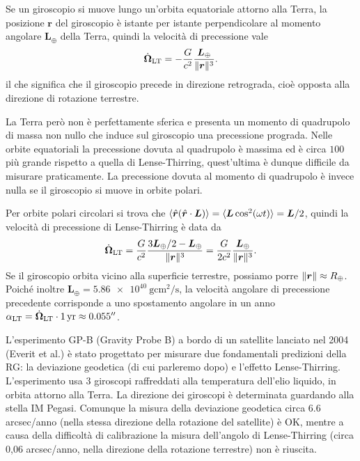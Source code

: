 Se un giroscopio si muove lungo un'orbita equatoriale attorno alla Terra, la
posizione $\bm{r}$ del giroscopio è istante per istante perpendicolare al
momento angolare $\bm{L}_{\oplus}$ della Terra, quindi la velocità di
precessione vale
\begin{equation}
  \dot{\bm{\Omega}}_{\textup{LT}} = - \frac{G}{c^{2}}
  \frac{\bm{L}_{\oplus}}{\lVert\bm{r}\rVert^{3}}.
\end{equation}
il che significa che il giroscopio precede in direzione retrograda, cioè opposta
alla direzione di rotazione terrestre.

La Terra però non è perfettamente sferica e presenta un momento di quadrupolo di
massa non nullo che induce sul giroscopio una precessione prograda.  Nelle
orbite equatoriali la precessione dovuta al quadrupolo è massima ed è circa
$100$ più grande rispetto a quella di Lense-Thirring, quest'ultima è dunque
difficile da misurare praticamente.  La precessione dovuta al momento di
quadrupolo è invece nulla se il giroscopio si muove in orbite polari.

Per orbite polari circolari si trova che $\langle \hat{\bm{r}}(\hat{\bm{r}} \cdot
\bm{L})\rangle = \langle \bm{L} \cos^{2}(\omega t)\rangle = \bm{L}/2$, quindi la
velocità di precessione di Lense-Thirring è data da
\begin{equation}
  \dot{\bm{\Omega}}_{\textup{LT}} = \frac{G}{c^{2}} \frac{3\bm{L}_{\oplus}/2 -
    \bm{L}_{\oplus}}{\lVert\bm{r}\rVert^{3}} = \frac{G}{2c^{2}}
  \frac{\bm{L}_{\oplus}}{\lVert\bm{r}\rVert^{3}}.
\end{equation}
Se il giroscopio orbita vicino alla superficie terrestre, possiamo porre
$\lVert\bm{r}\rVert \approx R_{\oplus}$.  Poiché inoltre $\bm{L}_{\oplus} =
\SI{5.86e40}{\gram \centi\metre\squared \per\second}$, la velocità angolare di
precessione precedente corrisponde a uno spostamento angolare in un anno
$\alpha_{\textup{LT}} = \dot{\bm{\Omega}}_{\textup{LT}} \cdot \SI{1}{yr} \approx
\SI{0.055}{\arcsecond}$.

L'esperimento GP-B (Gravity Probe B) a bordo di un satellite lanciato nel 2004
(Everit et al.) è stato progettato per misurare due fondamentali predizioni
della RG: la deviazione geodetica (di cui parleremo dopo) e l'effetto
Lense-Thirring.  L'esperimento usa 3 giroscopi raffreddati alla temperatura
dell'elio liquido, in orbita attorno alla Terra.  La direzione dei giroscopi è
determinata guardando alla stella IM Pegasi.  Comunque la misura della
deviazione geodetica circa 6.6 arcsec/anno (nella stessa direzione della
rotazione del satellite) è OK, mentre a causa della difficoltà di calibrazione
la misura dell'angolo di Lense-Thirring (circa 0,06 arcsec/anno, nella direzione
della rotazione terrestre) non è riuscita.


